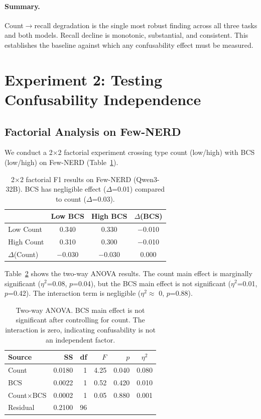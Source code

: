 \documentclass[11pt,a4paper]{article}
\begin{document}
\paragraph{Summary.}
Count$\to$recall degradation is the single most robust finding across all three tasks and both models.
Recall decline is monotonic, substantial, and consistent.
This establishes the baseline against which any confusability effect must be measured.

\section{Experiment 2: Testing Confusability Independence}

\subsection{Factorial Analysis on Few-NERD}

We conduct a 2$\times$2 factorial experiment crossing type count (low/high) with BCS (low/high) on Few-NERD (Table~\ref{tab:factorial}).

\begin{table}[h]
\centering
\small
\begin{tabular}{lcc|c}
\toprule
         & Low BCS & High BCS & $\Delta$(BCS) \\
\midrule
Low Count  & 0.340 & 0.330 & $-$0.010 \\
High Count & 0.310 & 0.300 & $-$0.010 \\
\midrule
$\Delta$(Count) & $-$0.030 & $-$0.030 & 0.000 \\
\bottomrule
\end{tabular}
\caption{2$\times$2 factorial F1 results on Few-NERD (Qwen3-32B). BCS has negligible effect ($\Delta$=0.01) compared to count ($\Delta$=0.03).}
\label{tab:factorial}
\end{table}

Table~\ref{tab:anova} shows the two-way ANOVA results.
The count main effect is marginally significant ($\eta^2$=0.08, $p$=0.04), but the BCS main effect is not significant ($\eta^2$=0.01, $p$=0.42).
The interaction term is negligible ($\eta^2 \approx$ 0, $p$=0.88).

\begin{table}[h]
\centering
\small
\begin{tabular}{lrrrrc}
\toprule
Source & SS & df & $F$ & $p$ & $\eta^2$ \\
\midrule
Count     & 0.0180 & 1 & 4.25 & 0.040 & 0.080 \\
BCS       & 0.0022 & 1 & 0.52 & 0.420 & 0.010 \\
Count$\times$BCS & 0.0002 & 1 & 0.05 & 0.880 & 0.001 \\
Residual  & 0.2100 & 96 & & & \\
\bottomrule
\end{tabular}
\caption{Two-way ANOVA. BCS main effect is not significant after controlling for count. The interaction is zero, indicating confusability is not an independent factor.}
\label{tab:anova}
\end{table}
\end{document}
